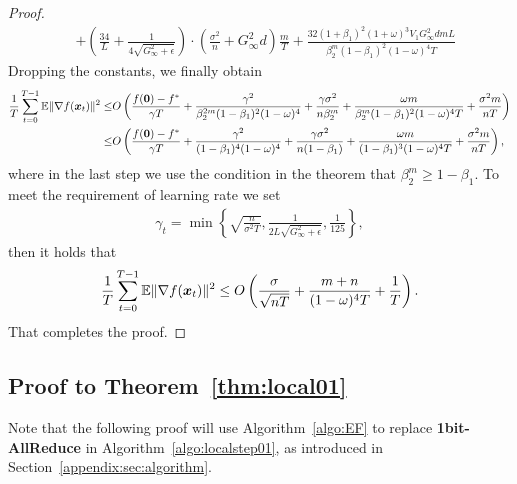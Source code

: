 \begin{proof}
\begin{align*}
& + \left( \frac{34}{L}+\frac{1}{4\sqrt{G_\infty^2+\epsilon}}\right)\cdot\left(\frac{\sigma^2}{n} + G_\infty^2d\right)\frac{m}{T} + \frac{32(1+\beta_1)^2(1+\omega)^3V_1G_\infty^2dmL}{\beta_2^m(1-\beta_1)^2(1-\omega)^4T}
\end{align*}
Dropping the constants, we finally obtain
\begin{align*}
    \frac{1}{T}\sum_{t=0}^{T-1}\mathbb{E}\|\nabla f(\boldsymbol{x}_t)\|^2 \leq & O\left( \frac{f(\boldsymbol{0}) - f^*}{\gamma T} + \frac{\gamma^2 }{\beta_2^{2m}(1-\beta_1)^2(1-\omega)^4} + \frac{\gamma\sigma^2}{n\beta_2^m} + \frac{\omega m}{\beta_2^m(1-\beta_1)^2(1-\omega)^4T} + \frac{\sigma^2m}{nT} \right) \\
\leq & O\left( \frac{f(\boldsymbol{0}) - f^*}{\gamma T} + \frac{\gamma^2 }{(1-\beta_1)^4(1-\omega)^4} + \frac{\gamma\sigma^2}{n(1-\beta_1)} + \frac{\omega m}{(1-\beta_1)^3(1-\omega)^4T} + \frac{\sigma^2m}{nT} \right),
\end{align*}
where in the last step we use the condition in the theorem that $\beta_2^m \geq 1-\beta_1$.
To meet the requirement of learning rate we set
\begin{align*}
    \gamma_t = \min\left\{ \sqrt{\frac{n}{\sigma^2T}}, \frac{1}{2L\sqrt{G_\infty^2+\epsilon}}, \frac{1}{125}  \right\},
\end{align*}
then it holds that
\begin{align*}
    \frac{1}{T}\sum_{t=0}^{T-1} \mathbb{E}\|\nabla f(\boldsymbol{x}_t)\|^2 \leq O\left( \frac{\sigma}{\sqrt{nT}} + \frac{m+n}{(1-\omega)^4T} +\frac{1}{T}\right).
\end{align*}
That completes the proof.
\end{proof}




\subsection{Proof to Theorem~\ref{thm:local01}}

Note that the following proof will use Algorithm~\ref{algo:EF} to replace \textbf{1bit-AllReduce} in Algorithm~\ref{algo:localstep01}, as introduced in Section~\ref{appendix:sec:algorithm}.

\thmzerooneadam*

